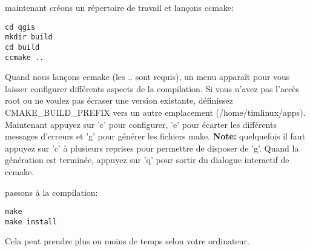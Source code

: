 maintenant créons un répertoire de travail et lançons ccmake:

\begin{verbatim}
cd qgis
mkdir build
cd build
ccmake ..
\end{verbatim}

Quand nous lançons ccmake (les .. sont requis), un menu apparaît pour vous laisser configurer différents aspects de la compilation. Si vous n'avez pas l'accès root ou ne voulez pas écraser une version existante, définissez CMAKE\_BUILD\_PREFIX vers un autre emplacement (/home/timlinux/apps). Maintenant appuyez sur 'c' pour configurer, 'e' pour écarter les différents messages d'erreurs et 'g' pour générer les fichiers make. \textbf{Note:} quelquefois il faut appuyez sur 'c' à plusieurs reprises pour permettre de disposer de 'g'.
Quand la génération est terminée, appuyez sur 'q' pour sortir du dialogue interactif de ccmake.

passons à la compilation:

\begin{verbatim}
make
make install
\end{verbatim}

Cela peut prendre plus ou moins de temps selon votre ordinateur.

% 
% 
% 
% 
% 
% 
% 
% 

